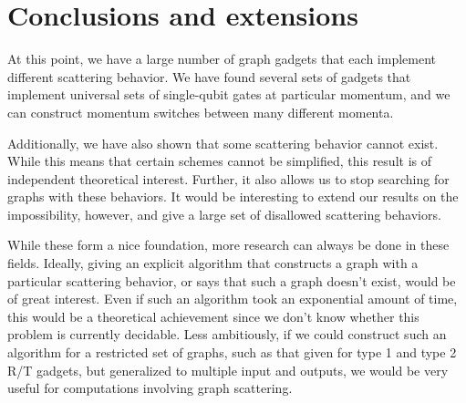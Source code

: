 \documentclass[../thesis-main/thesis-main]{subfiles}
\begin{document}
\section{Conclusions and extensions}

At this point, we have a large number of graph gadgets that each implement different scattering behavior.  We have found several sets of gadgets that implement universal sets of single-qubit gates at particular momentum, and we can construct momentum switches between many different momenta.  

Additionally, we have also shown that some scattering behavior cannot exist.  While this means that certain schemes cannot be simplified, this result is of independent theoretical interest.  Further, it also allows us to stop searching for graphs with these behaviors.  It would be interesting to extend our results on the impossibility, however, and give a large set of disallowed scattering behaviors.

While these form a nice foundation, more research can always be done in these fields.  Ideally, giving an explicit algorithm that constructs a graph with a particular scattering behavior, or says that such a graph doesn't exist, would be of great interest.  Even if such an algorithm took an exponential amount of time, this would be a theoretical achievement since we don't know whether this problem is currently decidable.  Less ambitiously, if we could construct such an algorithm for a restricted set of graphs, such as that given for type 1 and type 2 R/T gadgets, but generalized to multiple input and outputs, we would be very useful for computations involving graph scattering.  

\biblio{}
\end{document}
